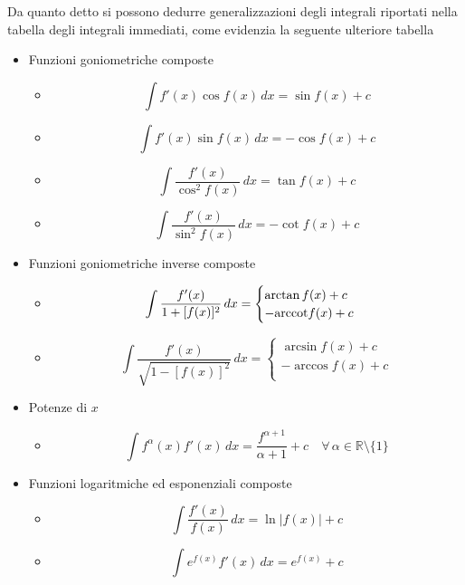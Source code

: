 \documentclass{article}
\theoremstyle{plain}
\theoremstyle{definition}
\theoremstyle{remark}
\begin{document}
Da quanto detto si possono dedurre generalizzazioni degli integrali riportati nella tabella degli integrali immediati, come evidenzia la seguente ulteriore tabella 
\begin{multicols}{2}
	\begin{itemize}
        \item Funzioni goniometriche composte
        \begin{itemize}
            \item[] \[\int f'(x)\cos f(x) \,dx = \sin f(x) +c\]
            \item[] \[\int f'(x)\sin f(x) \,dx = -\cos f(x) +c\]
            \item[] \[\int \dfrac{f'(x)}{\cos^2f(x)} \,dx= \tan f(x) +c\]
		    \item[] \[\int \dfrac{f'(x)}{\sin^2f(x)} \,dx= -\cot f(x) +c\]
        \end{itemize}
        \item Funzioni goniometriche inverse composte
        \begin{itemize}
            \item[] \[\int\dfrac{f'(x)}{1+[f(x)]^2}\, dx=\begin{cases}
            \arctan f(x)+c\\
            -\textup{arccot} f(x)+c\\
            \end{cases}\]
            \item[] \[\int\dfrac{f'(x)}{\sqrt{1-[f(x)]^2}}\, dx=\begin{cases}
            \arcsin f(x)+c\\
            -\arccos f(x)+c\\
            \end{cases}\]
        \end{itemize}
        \item Potenze di $x$
        \begin{itemize}
            \item[] \[\int f^\alpha(x)f'(x) \,dx = \dfrac{f^{\alpha+1}}{\alpha+1} +c\quad\forall\,\alpha\in\mathbb{R}\setminus\{1\}\]
        \end{itemize}
        \item Funzioni logaritmiche ed esponenziali composte
        \begin{itemize}
            \item[] \[\int \dfrac{f'(x)}{f(x)} \,dx = \ln|f(x)| +c\]
		    \item[] \[\int e^{f(x)}f'(x) \,dx = e^{f(x)} +c\]

\end{itemize}
\end{itemize}
\end{multicols}
\end{document}

